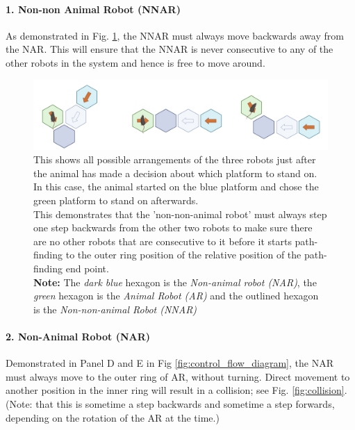 \paragraph{1. Non-non Animal Robot (NNAR)}

As demonstrated in Fig. \ref{fig:post_decision_states}, the NNAR must always move backwards away from the NAR. This will ensure that the NNAR is never consecutive to any of the other robots in the system and hence is free to move around.


\begin{figure}[H]
    \centering
    \includegraphics[scale = 0.5]{images/post_decision_state.png}
    \caption{This shows all possible arrangements of the three robots just after the animal has made a decision about which platform to stand on. In this case, the animal started on the blue platform and chose the green platform to stand on afterwards. \\ This demonstrates that the 'non-non-animal robot' must always step one step backwards from the other two robots to make sure there are no other robots that are consecutive to it before it starts path-finding to the outer ring position of the relative position of the path-finding end point.\\ \textbf{Note:} The \textit{dark blue} hexagon is the \textit{Non-animal robot (NAR)}, the \textit{green} hexagon is the \textit{Animal Robot (AR)} and the outlined hexagon is the \textit{Non-non-animal Robot (NNAR)}}
    \label{fig:post_decision_states}
\end{figure}

\paragraph{2. Non-Animal Robot (NAR)}

Demonstrated in Panel D and E in Fig \ref{fig:control_flow_diagram}, the NAR must always move to the outer ring of AR, without turning. Direct movement to another position in the inner ring will result in a collision; see Fig. \ref{fig:collision}. (Note: that this is sometime a step backwards and sometime a step forwards, depending on the rotation of the AR at the time.)


